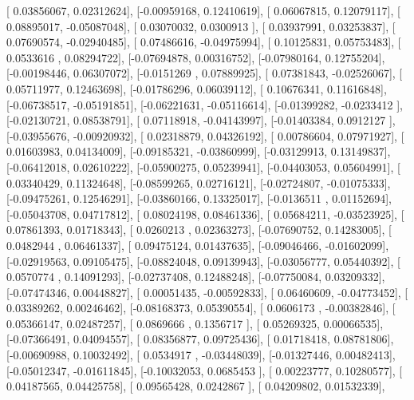 \documentclass{article}
\begin{document}
       [ 0.03856067,  0.02312624],
       [-0.00959168,  0.12410619],
       [ 0.06067815,  0.12079117],
       [ 0.08895017, -0.05087048],
       [ 0.03070032,  0.0300913 ],
       [ 0.03937991,  0.03253837],
       [ 0.07690574, -0.02940485],
       [ 0.07486616, -0.04975994],
       [ 0.10125831,  0.05753483],
       [ 0.0533616 ,  0.08294722],
       [-0.07694878,  0.00316752],
       [-0.07980164,  0.12755204],
       [-0.00198446,  0.06307072],
       [-0.0151269 ,  0.07889925],
       [ 0.07381843, -0.02526067],
       [ 0.05711977,  0.12463698],
       [-0.01786296,  0.06039112],
       [ 0.10676341,  0.11616848],
       [-0.06738517, -0.05191851],
       [-0.06221631, -0.05116614],
       [-0.01399282, -0.0233412 ],
       [-0.02130721,  0.08538791],
       [ 0.07118918, -0.04143997],
       [-0.01403384,  0.0912127 ],
       [-0.03955676, -0.00920932],
       [ 0.02318879,  0.04326192],
       [ 0.00786604,  0.07971927],
       [ 0.01603983,  0.04134009],
       [-0.09185321, -0.03860999],
       [-0.03129913,  0.13149837],
       [-0.06412018,  0.02610222],
       [-0.05900275,  0.05239941],
       [-0.04403053,  0.05604991],
       [ 0.03340429,  0.11324648],
       [-0.08599265,  0.02716121],
       [-0.02724807, -0.01075333],
       [-0.09475261,  0.12546291],
       [-0.03860166,  0.13325017],
       [-0.0136511 ,  0.01152694],
       [-0.05043708,  0.04717812],
       [ 0.08024198,  0.08461336],
       [ 0.05684211, -0.03523925],
       [ 0.07861393,  0.01718343],
       [ 0.0260213 ,  0.02363273],
       [-0.07690752,  0.14283005],
       [ 0.0482944 ,  0.06461337],
       [ 0.09475124,  0.01437635],
       [-0.09046466, -0.01602099],
       [-0.02919563,  0.09105475],
       [-0.08824048,  0.09139943],
       [-0.03056777,  0.05440392],
       [ 0.0570774 ,  0.14091293],
       [-0.02737408,  0.12488248],
       [-0.07750084,  0.03209332],
       [-0.07474346,  0.00448827],
       [ 0.00051435, -0.00592833],
       [ 0.06460609, -0.04773452],
       [ 0.03389262,  0.00246462],
       [-0.08168373,  0.05390554],
       [ 0.0606173 , -0.00382846],
       [ 0.05366147,  0.02487257],
       [ 0.0869666 ,  0.1356717 ],
       [ 0.05269325,  0.00066535],
       [-0.07366491,  0.04094557],
       [ 0.08356877,  0.09725436],
       [ 0.01718418,  0.08781806],
       [-0.00690988,  0.10032492],
       [ 0.0534917 , -0.03448039],
       [-0.01327446,  0.00482413],
       [-0.05012347, -0.01611845],
       [-0.10032053,  0.0685453 ],
       [ 0.00223777,  0.10280577],
       [ 0.04187565,  0.04425758],
       [ 0.09565428,  0.0242867 ],
       [ 0.04209802,  0.01532339],
\end{document}
